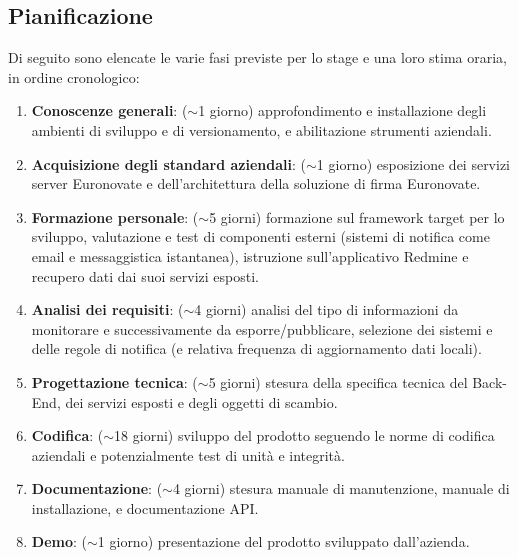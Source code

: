 \subsection{Pianificazione}
	Di seguito sono elencate le varie fasi previste per lo stage e una loro stima oraria, in ordine cronologico:
	\begin{enumerate}
		\item \textbf{Conoscenze generali}: ($\sim$1 giorno) approfondimento e installazione degli ambienti di sviluppo e di versionamento, e abilitazione strumenti aziendali. 
		\item \textbf{Acquisizione degli standard aziendali}: ($\sim$1 giorno) esposizione dei servizi server Euronovate e dell'architettura della soluzione di firma Euronovate. 
		\item \textbf{Formazione personale}: ($\sim$5 giorni) formazione sul framework target per lo sviluppo, valutazione e test di componenti esterni (sistemi di notifica come email e messaggistica istantanea), istruzione sull'applicativo Redmine e recupero dati dai suoi servizi esposti.
		\item \textbf{Analisi dei requisiti}: ($\sim$4 giorni) analisi del tipo di informazioni da monitorare e successivamente da esporre/pubblicare, selezione dei sistemi e delle regole di notifica (e relativa frequenza di aggiornamento dati locali).
		\item \textbf{Progettazione tecnica}: ($\sim$5 giorni) stesura della specifica tecnica del Back-End, dei servizi esposti e degli oggetti di scambio.
		\item \textbf{Codifica}: ($\sim$18 giorni) sviluppo del prodotto seguendo le norme di codifica aziendali e potenzialmente test di unità e integrità.
		\item \textbf{Documentazione}: ($\sim$4 giorni) stesura manuale di manutenzione, manuale di installazione, e documentazione API.
		\item \textbf{Demo}: ($\sim$1 giorno) presentazione del prodotto sviluppato dall'azienda. 
	\end{enumerate}
\iffalse
